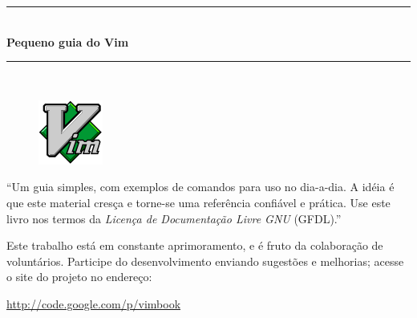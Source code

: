 \documentclass[10pt,a4paper,openany]{book}
\newcommand{\titulo}{\Huge \sc Pequeno guia do Vim}
\begin{document}
{}

\begin{titlepage}
 \begin{flushleft}
   \vspace{2mm}
   \vspace{2mm}
   \vspace{2mm}
 \end{flushleft}
\begin{center}
   \rule{12cm}{1mm} \\ \vspace{2mm}
   {\LARGE{\bf{\titulo}}} \\
   \vspace{-1mm}
   \rule{12cm}{1mm} \\


  \vspace{2cm}
  \begin{figure}[h]
    \center
    \includegraphics{img/vimlogo.png}
    \label{logodovim}
\end{figure}

   \vspace{3cm}
   \begin{flushright}
   \begin{minipage}[t]{8cm}
          ``Um guia simples, com exemplos de comandos
          para uso no dia-a-dia. A idéia é que este
          material cresça e torne-se uma referência confiável
          e prática. Use este livro nos termos da {\em Licença de Documentação Livre GNU} (GFDL).'' \\
          \par Este trabalho está em constante aprimoramento, e é fruto da
          colaboração de voluntários. Participe do desenvolvimento enviando sugestões e
          melhorias; acesse o site do projeto no endereço: \\
\begin{center}
          \url{http://code.google.com/p/vimbook}
\end{center}
        

\end{minipage}
\end{flushright}
\end{center}
\end{titlepage}
\end{document}
